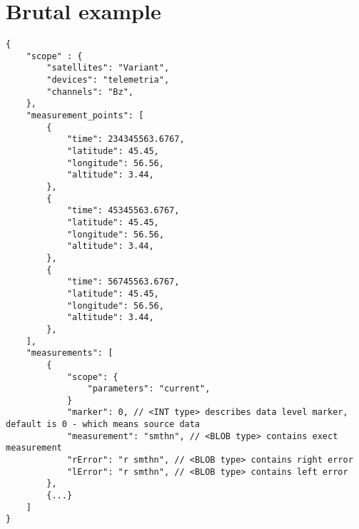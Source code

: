 \documentclass{article}
\begin{document}
    \section{Brutal example}
\medskip
\begin{lstlisting}[caption=Brutal example]
{
    "scope" : {
        "satellites": "Variant",
        "devices": "telemetria",
        "channels": "Bz",
    },
    "measurement_points": [
        {
            "time": 234345563.6767,
            "latitude": 45.45,
            "longitude": 56.56,
            "altitude": 3.44,
        },
        {
            "time": 45345563.6767,
            "latitude": 45.45,
            "longitude": 56.56,
            "altitude": 3.44,
        },
        {
            "time": 56745563.6767,
            "latitude": 45.45,
            "longitude": 56.56,
            "altitude": 3.44,
        },
    ],
    "measurements": [
        {
            "scope": {
                "parameters": "current",
            }
            "marker": 0, // <INT type> describes data level marker, default is 0 - which means source data
            "measurement": "smthn", // <BLOB type> contains exect measurement
            "rError": "r smthn", // <BLOB type> contains right error
            "lError": "r smthn", // <BLOB type> contains left error
        },
        {...}
    ]
}
\end{lstlisting}
\end{document}
